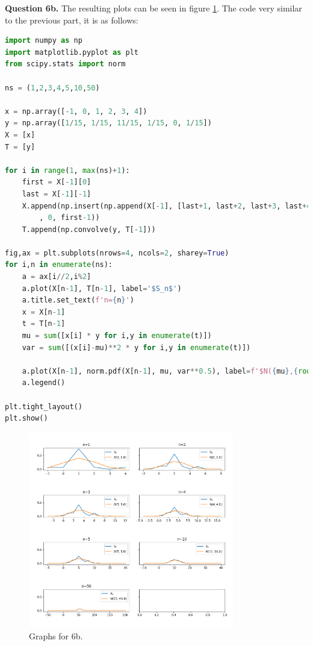 \documentclass[letterpaper, reqno,11pt]{article}
\begin{document}
{\medskip\noindent\bf Question 6b.} The resulting plots can be seen in figure \ref{fig:6b}. The code very similar to the previous part, it is as follows: 

\begin{lstlisting}[language=Python]
import numpy as np
import matplotlib.pyplot as plt
from scipy.stats import norm

ns = (1,2,3,4,5,10,50)

x = np.array([-1, 0, 1, 2, 3, 4])
y = np.array([1/15, 1/15, 11/15, 1/15, 0, 1/15])
X = [x]
T = [y]

for i in range(1, max(ns)+1):
    first = X[-1][0]
    last = X[-1][-1]
    X.append(np.insert(np.append(X[-1], [last+1, last+2, last+3, last+4])\
        , 0, first-1))
    T.append(np.convolve(y, T[-1]))

fig,ax = plt.subplots(nrows=4, ncols=2, sharey=True)
for i,n in enumerate(ns):
    a = ax[i//2,i%2]
    a.plot(X[n-1], T[n-1], label='$S_n$')
    a.title.set_text(f'n={n}')
    x = X[n-1]
    t = T[n-1]
    mu = sum([x[i] * y for i,y in enumerate(t)])
    var = sum([(x[i]-mu)**2 * y for i,y in enumerate(t)])
    
    a.plot(X[n-1], norm.pdf(X[n-1], mu, var**0.5), label=f'$N({mu},{round(var,1)})$')
    a.legend()

plt.tight_layout()
plt.show()


\end{lstlisting}

\begin{figure}[htpb]
    \centering
    \includegraphics[width=0.8\textwidth]{6b}
    \caption{Graphs for 6b.}
    \label{fig:6b}
\end{figure}
\end{document}
